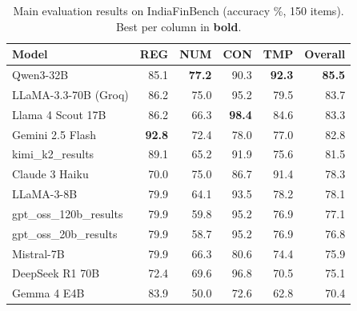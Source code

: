 \begin{table}[h]
\centering
\caption{Main evaluation results on IndiaFinBench (accuracy \%, 150 items). Best per column in \textbf{bold}.}
\label{tab:main_results}
\begin{tabular}{lrrrrr}
\toprule
\textbf{Model} & \textbf{REG} & \textbf{NUM} & \textbf{CON} & \textbf{TMP} & \textbf{Overall} \\
\midrule
Qwen3-32B & 85.1 & \textbf{77.2} & 90.3 & \textbf{92.3} & \textbf{85.5} \\
LLaMA-3.3-70B (Groq) & 86.2 & 75.0 & 95.2 & 79.5 & 83.7 \\
Llama 4 Scout 17B & 86.2 & 66.3 & \textbf{98.4} & 84.6 & 83.3 \\
Gemini 2.5 Flash & \textbf{92.8} & 72.4 & 78.0 & 77.0 & 82.8 \\
kimi_k2_results & 89.1 & 65.2 & 91.9 & 75.6 & 81.5 \\
Claude 3 Haiku & 70.0 & 75.0 & 86.7 & 91.4 & 78.3 \\
LLaMA-3-8B & 79.9 & 64.1 & 93.5 & 78.2 & 78.1 \\
gpt_oss_120b_results & 79.9 & 59.8 & 95.2 & 76.9 & 77.1 \\
gpt_oss_20b_results & 79.9 & 58.7 & 95.2 & 76.9 & 76.8 \\
Mistral-7B & 79.9 & 66.3 & 80.6 & 74.4 & 75.9 \\
DeepSeek R1 70B & 72.4 & 69.6 & 96.8 & 70.5 & 75.1 \\
Gemma 4 E4B & 83.9 & 50.0 & 72.6 & 62.8 & 70.4 \\
\bottomrule
\end{tabular}
\end{table}
